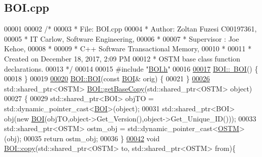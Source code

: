 \hypertarget{_b_o_i_8cpp_source}{}\subsection{B\+O\+I.\+cpp}

\begin{DoxyCode}
00001 
00002 \textcolor{comment}{/* }
00003 \textcolor{comment}{ * File:   BOI.cpp}
00004 \textcolor{comment}{ * Author: Zoltan Fuzesi C00197361, }
00005 \textcolor{comment}{ * IT Carlow, Software Engineering, }
00006 \textcolor{comment}{ *}
00007 \textcolor{comment}{ * Supervisor : Joe Kehoe, }
00008 \textcolor{comment}{ *}
00009 \textcolor{comment}{ * C++ Software Transactional Memory, }
00010 \textcolor{comment}{ * }
00011 \textcolor{comment}{ * Created on December 18, 2017, 2:09 PM}
00012 \textcolor{comment}{ * OSTM base class function declarations.}
00013 \textcolor{comment}{ */}
00014 
00015 \textcolor{preprocessor}{#include "\hyperlink{_b_o_i_8h}{BOI.h}"}
00016 
\hypertarget{_b_o_i_8cpp_source.tex_l00017}{}\hyperlink{class_b_o_i_a617f46a599129178c6b11b4846759a6c_a617f46a599129178c6b11b4846759a6c}{00017} \hyperlink{class_b_o_i_a617f46a599129178c6b11b4846759a6c_a617f46a599129178c6b11b4846759a6c}{BOI::~BOI}() \{
00018 \}
00019 
\hypertarget{_b_o_i_8cpp_source.tex_l00020}{}\hyperlink{class_b_o_i_a7757de8d3ac656871bed4b07d77457ff_a7757de8d3ac656871bed4b07d77457ff}{00020} \hyperlink{class_b_o_i_a6af682a5f199a029681f0cb2b8658706_a6af682a5f199a029681f0cb2b8658706}{BOI::BOI}(\textcolor{keyword}{const} \hyperlink{class_b_o_i}{BOI}& orig) \{
00021 \}
\hypertarget{_b_o_i_8cpp_source.tex_l00026}{}\hyperlink{class_b_o_i_ad53ae2918a656793b9d7a670d35ecfa3_ad53ae2918a656793b9d7a670d35ecfa3}{00026} std::shared\_ptr<OSTM> \hyperlink{class_b_o_i_ad53ae2918a656793b9d7a670d35ecfa3_ad53ae2918a656793b9d7a670d35ecfa3}{BOI::getBaseCopy}(std::shared\_ptr<OSTM> \textcolor{keywordtype}{object})
00027 \{
00029     std::shared\_ptr<BOI> objTO = std::dynamic\_pointer\_cast<\hyperlink{class_b_o_i}{BOI}>(object);
00031     std::shared\_ptr<BOI> obj(\textcolor{keyword}{new} \hyperlink{class_b_o_i_a6af682a5f199a029681f0cb2b8658706_a6af682a5f199a029681f0cb2b8658706}{BOI}(objTO,object->Get\_Version(),\textcolor{keywordtype}{object}->Get\_Unique\_ID()));
00033     std::shared\_ptr<OSTM> ostm\_obj = std::dynamic\_pointer\_cast<\hyperlink{class_o_s_t_m}{OSTM}>(obj);
00035     \textcolor{keywordflow}{return} ostm\_obj;
00036 \}
\hypertarget{_b_o_i_8cpp_source.tex_l00042}{}\hyperlink{class_b_o_i_a9ff2d32c25c23a1bea6316f50c3bf677_a9ff2d32c25c23a1bea6316f50c3bf677}{00042} \textcolor{keywordtype}{void} \hyperlink{class_b_o_i_a9ff2d32c25c23a1bea6316f50c3bf677_a9ff2d32c25c23a1bea6316f50c3bf677}{BOI::copy}(std::shared\_ptr<OSTM> to, std::shared\_ptr<OSTM> from)\{

\end{DoxyCode}
